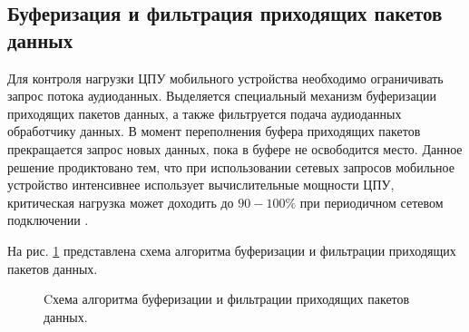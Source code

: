     \subsection{Буферизация и фильтрация приходящих пакетов данных}
        \par Для контроля нагрузки ЦПУ мобильного устройства необходимо ограничивать запрос потока аудиоданных.
        Выделяется специальный механизм буферизации приходящих пакетов данных, 
        а также фильтруется подача аудиоданных обработчику данных.
        В момент переполнения буфера приходящих пакетов прекращается запрос новых данных, 
        пока в буфере не освободится место. 
        Данное решение продиктовано тем, 
        что при использовании сетевых запросов мобильное устройство интенсивнее использует вычислительные мощности ЦПУ, 
        критическая нагрузка может доходить до $90-100\%$ при периодичном сетевом подключении \cite{CPUUtilization}.

        \par На рис. \ref{fig:throttler-scheme} представлена схема алгоритма буферизации и фильтрации приходящих пакетов данных.
        \begin{figure}[!h]
            \caption{Cхема алгоритма буферизации и фильтрации приходящих пакетов данных.}
            \label{fig:throttler-scheme}
        \end{figure}

